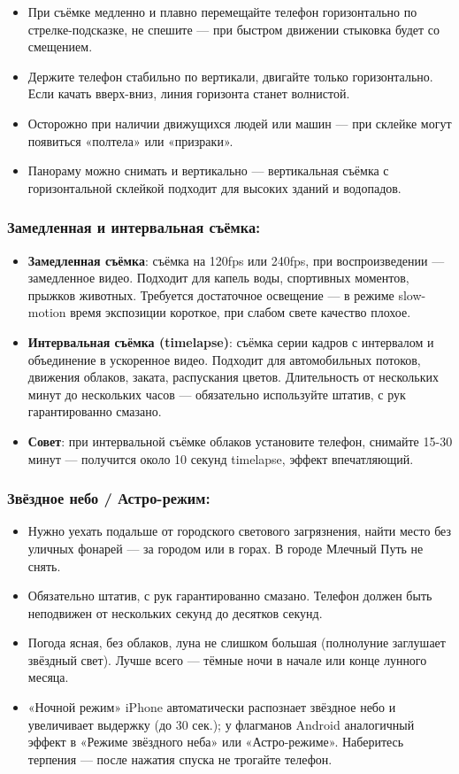 \begin{itemize}
  \item При съёмке медленно и плавно перемещайте телефон горизонтально по стрелке-подсказке, не спешите — при быстром движении стыковка будет со смещением.
  \item Держите телефон стабильно по вертикали, двигайте только горизонтально. Если качать вверх-вниз, линия горизонта станет волнистой.
  \item Осторожно при наличии движущихся людей или машин — при склейке могут появиться «полтела» или «призраки».
  \item Панораму можно снимать и вертикально — вертикальная съёмка с горизонтальной склейкой подходит для высоких зданий и водопадов.
\end{itemize}

\subsubsection*{Замедленная и интервальная съёмка:}

\begin{itemize}
  \item \textbf{Замедленная съёмка}: съёмка на 120fps или 240fps, при воспроизведении — замедленное видео. Подходит для капель воды, спортивных моментов, прыжков животных. Требуется достаточное освещение — в режиме slow-motion время экспозиции короткое, при слабом свете качество плохое.
  \item \textbf{Интервальная съёмка (timelapse)}: съёмка серии кадров с интервалом и объединение в ускоренное видео. Подходит для автомобильных потоков, движения облаков, заката, распускания цветов. Длительность от нескольких минут до нескольких часов — обязательно используйте штатив, с рук гарантированно смазано.
  \item \textbf{Совет}: при интервальной съёмке облаков установите телефон, снимайте 15-30 минут — получится около 10 секунд timelapse, эффект впечатляющий.
\end{itemize}

\subsubsection*{Звёздное небо / Астро-режим:}

\begin{itemize}
  \item Нужно уехать подальше от городского светового загрязнения, найти место без уличных фонарей — за городом или в горах. В городе Млечный Путь не снять.
  \item Обязательно штатив, с рук гарантированно смазано. Телефон должен быть неподвижен от нескольких секунд до десятков секунд.
  \item Погода ясная, без облаков, луна не слишком большая (полнолуние заглушает звёздный свет). Лучше всего — тёмные ночи в начале или конце лунного месяца.
  \item «Ночной режим» iPhone автоматически распознает звёздное небо и увеличивает выдержку (до 30 сек.); у флагманов Android аналогичный эффект в «Режиме звёздного неба» или «Астро-режиме». Наберитесь терпения — после нажатия спуска не трогайте телефон.
\end{itemize}

